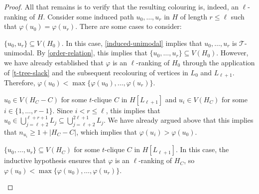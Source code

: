 \documentclass[kpfonts]{patmorin}
\theoremstyle{named}
\begin{document}
\begin{proof}
    All that remains is to verify that the resulting colouring is, indeed, an $\ell$-ranking of $H$.  Consider some induced path $u_0,\ldots,u_r$ in $H$ of length $r\le\ell$ such that $\varphi(u_0)=\varphi(u_r)$.  There are some cases to consider:

    \begin{compactenum}
        \item $\{u_0,u_r\}\subseteq V(H_0)$. In this case, \cref{induced-unimodal} implies that $u_0,\ldots,u_r$ is $\mathcal{T}$-unimodal.  By \cref{order-relation}, this implies that $\{u_0,\ldots,u_r\}\subseteq V(H_0)$.  However, we have already established that $\varphi$ is an $\ell$-ranking of $H_0$ through the application of \cref{t-tree-slack} and the subsequent recolouring of vertices in $L_0$ and $L_{\ell+1}$.  Therefore, $\varphi(u_0)<\max\{\varphi(u_0),\ldots,\varphi(u_r)\}$.

        \item $u_0\in V(H_C-C)$ for some $t$-clique $C$ in $H[L_{\ell+1}]$ and $u_i\in V(H_C)$ for some $i\in\{1,\ldots,r-1\}$.  Since $i<r\le\ell$, this implies that $u_0\in\bigcup_{j=\ell+2}^{\ell+r+1} L_j\subseteq \bigcup_{j=\ell+2}^{2\ell+1}L_j$.  We have already argued above that this implies that $n_{u_i} \ge 1+|H_C-C|$, which implies that $\varphi(u_i)>\varphi(u_0)$.

        \item $\{u_0,\ldots,u_r\}\subseteq V(H_C)$ for some $t$-clique $C$ in $H[L_{\ell+1}]$.  In this case, the inductive hypothesis ensures that $\varphi$ is an $\ell$-ranking of $H_C$, so $\varphi(u_0)<\max\{\varphi(u_0),\ldots,\varphi(u_r)\}$. \qedhere
    \end{compactenum}
\end{proof}
\end{document}
